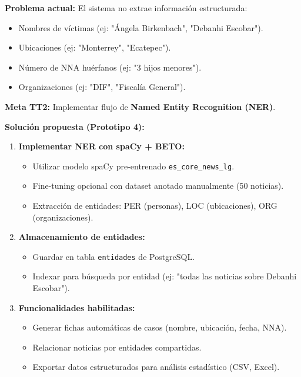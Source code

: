 \textbf{Problema actual:} El sistema no extrae información estructurada:
\begin{itemize}
    \item Nombres de víctimas (ej: "Ángela Birkenbach", "Debanhi Escobar").
    \item Ubicaciones (ej: "Monterrey", "Ecatepec").
    \item Número de NNA huérfanos (ej: "3 hijos menores").
    \item Organizaciones (ej: "DIF", "Fiscalía General").
\end{itemize}

\textbf{Meta TT2:} Implementar flujo de \textbf{Named Entity Recognition (NER)}.

\textbf{Solución propuesta (Prototipo 4):}
\begin{enumerate}
    \item \textbf{Implementar NER con spaCy + BETO:}
    \begin{itemize}
        \item Utilizar modelo spaCy pre-entrenado \texttt{es\_core\_news\_lg}.
        \item Fine-tuning opcional con dataset anotado manualmente (50 noticias).
        \item Extracción de entidades: PER (personas), LOC (ubicaciones), ORG (organizaciones).
    \end{itemize}
    
    \item \textbf{Almacenamiento de entidades:}
    \begin{itemize}
        \item Guardar en tabla \texttt{entidades} de PostgreSQL.
        \item Indexar para búsqueda por entidad (ej: "todas las noticias sobre Debanhi Escobar").
    \end{itemize}
    
    \item \textbf{Funcionalidades habilitadas:}
    \begin{itemize}
        \item Generar fichas automáticas de casos (nombre, ubicación, fecha, NNA).
        \item Relacionar noticias por entidades compartidas.
        \item Exportar datos estructurados para análisis estadístico (CSV, Excel).
    \end{itemize}
\end{enumerate}

